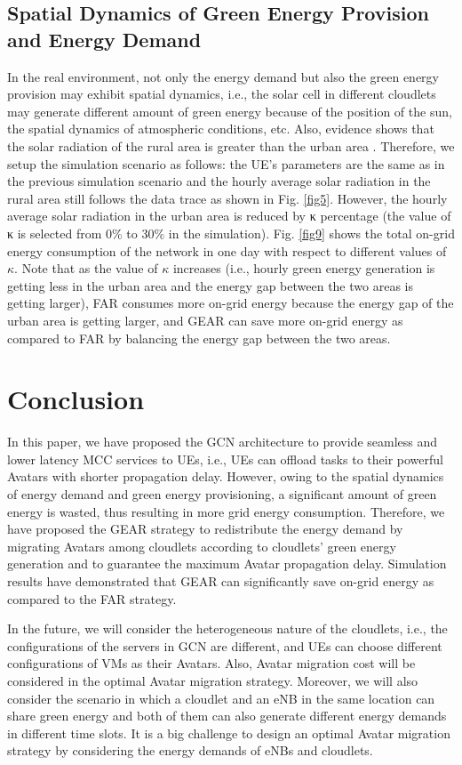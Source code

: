 \documentclass[journal,12pt,draftclsnofoot,onecolumn]{IEEEtran}
\begin{document}
\subsection{Spatial Dynamics of Green Energy Provision and Energy Demand}
In the real environment, not only the energy demand but also the green energy provision may exhibit spatial dynamics, i.e., the solar cell in different cloudlets may generate different amount of green energy because of the position of the sun, the spatial dynamics of atmospheric conditions, etc. Also, evidence shows that the solar radiation of the rural area is greater than the urban area \cite{28}. Therefore, we setup the simulation scenario as follows: the UE's parameters are the same as in the previous simulation scenario and the hourly average solar radiation in the rural area still follows the data trace as shown in Fig. \ref{fig5}. However, the hourly average solar radiation in the urban area is reduced by κ percentage (the value of κ is selected from 0\% to 30\% in the simulation). Fig. \ref{fig9} shows the total on-grid energy consumption of the network in one day with respect to different values of $\kappa$. Note that as the value of $\kappa$ increases (i.e., hourly green energy generation is getting less in the urban area and the energy gap between the two areas is getting larger), FAR consumes more on-grid energy because the energy gap of the urban area is getting larger, and GEAR can save more on-grid energy as compared to FAR by balancing the energy gap between the two areas.
	
	
\section{Conclusion}
In this paper, we have proposed the GCN architecture to provide seamless and lower latency MCC services to UEs, i.e., UEs can offload tasks to their powerful Avatars with shorter propagation delay. However, owing to the spatial dynamics of energy demand and green energy provisioning, a significant amount of green energy is wasted, thus resulting in more grid energy consumption. Therefore, we have proposed the GEAR strategy to redistribute the energy demand by migrating Avatars among cloudlets according to cloudlets' green energy generation and to guarantee the maximum Avatar propagation delay. Simulation results have demonstrated that GEAR can significantly save on-grid energy as compared to the FAR strategy.\

In the future, we will consider the heterogeneous nature of the cloudlets, i.e., the configurations of the servers in GCN are different, and UEs can choose different configurations of VMs as their Avatars. Also, Avatar migration cost will be considered in the optimal Avatar migration strategy. Moreover, we will also consider the scenario in which a cloudlet and an eNB in the same location can share green energy and both of them can also generate different energy demands in different time slots. It is a big challenge to design an optimal Avatar migration strategy by considering the energy demands of eNBs and cloudlets.
\end{document}
